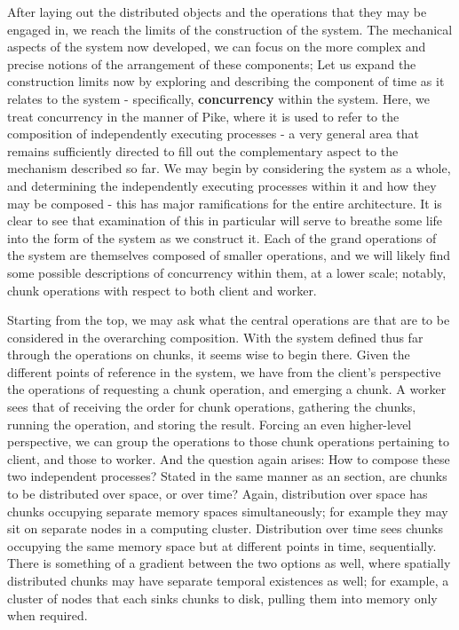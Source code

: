 After laying out the distributed objects and the operations that they may be engaged in, we reach the limits of the construction of the system.
The mechanical aspects of the system now developed, we can focus on the more complex and precise notions of the arrangement of these components; Let us expand the construction limits now by exploring and describing the component of time as it relates to the system - specifically, \textbf{concurrency} within the system.
Here, we treat concurrency in the manner of Pike, where it is used to refer to the composition of independently executing processes - a very general area that remains sufficiently directed to fill out the complementary aspect to the mechanism described so far.
We may begin by considering the system as a whole, and determining the independently executing processes within it and how they may be composed - this has major ramifications for the entire architecture.
It is clear to see that examination of this in particular will serve to breathe some life into the form of the system as we construct it.
Each of the grand operations of the system are themselves composed of smaller operations, and we will likely find some possible descriptions of concurrency within them, at a lower scale; notably, chunk operations with respect to both client and worker.

Starting from the top, we may ask what the central operations are that are to be considered in the overarching composition.
With the system defined thus far through the operations on chunks, it seems wise to begin there.
Given the different points of reference in the system, we have from the client's perspective the operations of requesting a chunk operation, and emerging a chunk.
A worker sees that of receiving the order for chunk operations, gathering the chunks, running the operation, and storing the result.
Forcing an even higher-level perspective, we can group the operations to those chunk operations pertaining to client, and those to worker.
And the question again arises: How to compose these two independent processes?
Stated in the same manner as an section, are chunks to be distributed over space, or over time?
Again, distribution over space has chunks occupying separate memory spaces simultaneously; for example they may sit on separate nodes in a computing cluster.
Distribution over time sees chunks occupying the same memory space but at different points in time, sequentially.
There is something of a gradient between the two options as well, where spatially distributed chunks may have separate temporal existences as well; for example, a cluster of nodes that each sinks chunks to disk, pulling them into memory only when required.

